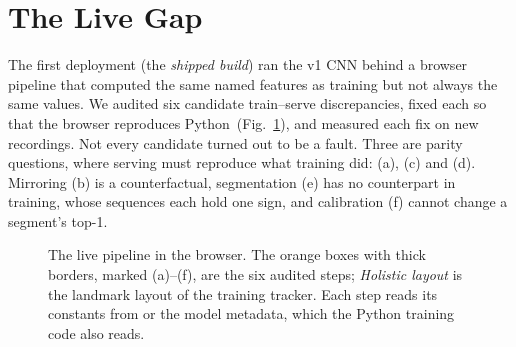 \section{The Live Gap}
\label{sec:livegap}

The first deployment (the \emph{shipped build}) ran the v1 CNN behind a browser pipeline that
computed the same named features as training but not always the same values. We audited six
candidate train--serve discrepancies, fixed each so that the browser reproduces Python\ifwithpipeline\
(Fig.~\ref{fig:pipeline})\fi, and measured each fix on new recordings. Not every candidate turned
out to be a fault. Three are parity questions, where serving must reproduce what training did:
(a), (c) and (d). Mirroring (b) is a counterfactual, segmentation (e) has no counterpart in
training, whose sequences each hold one sign, and calibration (f) cannot change a segment's top-1.

\ifwithpipeline
\begin{figure}[t]
\centering
{}
\caption{The live pipeline in the browser. The orange boxes with thick borders, marked (a)--(f),
are the six audited steps; \emph{Holistic layout} is the landmark layout of the training tracker.
Each step reads its constants from \cfg{features\_spec.json} or the model metadata, which the
Python training code also reads.}
\label{fig:pipeline}
\end{figure}
\fi

